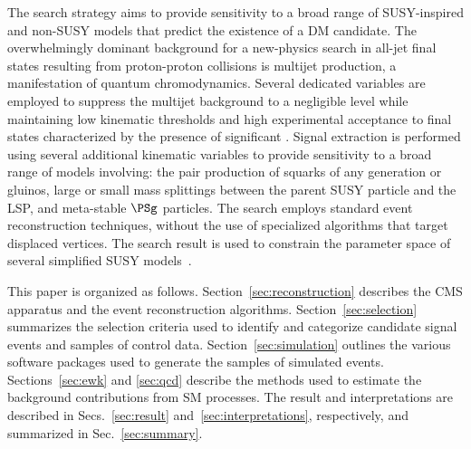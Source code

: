 The search strategy aims to provide sensitivity to a broad range of
SUSY-inspired and non-SUSY models that predict the existence of a DM
candidate. The overwhelmingly dominant background for a new-physics
search in all-jet final states resulting from proton-proton collisions
is multijet production, a manifestation of quantum
chromodynamics. Several dedicated variables are employed to suppress
the multijet background to a negligible level while maintaining low
kinematic thresholds and high experimental acceptance to final states
characterized by the presence of significant \ptvecmiss. Signal
extraction is performed using several additional kinematic variables
to provide sensitivity to a broad range of models involving: the pair
production of squarks of any generation or gluinos, large or small
mass splittings between the parent SUSY particle and the LSP, and
meta-stable $\PSg$ particles. The search employs standard event
reconstruction techniques, without the use of specialized algorithms
that target displaced vertices. The search result is used to constrain
the parameter space of several simplified SUSY
models~\cite{Alwall:2008ag, Alwall:2008va, sms}.


This paper is organized as follows. Section~\ref{sec:reconstruction}
describes the CMS apparatus and the event reconstruction
algorithms. Section~\ref{sec:selection} summarizes the selection
criteria used to identify and categorize candidate signal events and
samples of control data. Section~\ref{sec:simulation} outlines the
various software packages used to generate the samples of simulated
events. Sections~\ref{sec:ewk} and \ref{sec:qcd} describe the methods
used to estimate the background contributions from SM processes. The
result and interpretations are described in Secs.~\ref{sec:result}
and~\ref{sec:interpretations}, respectively, and summarized in
Sec.~\ref{sec:summary}.

